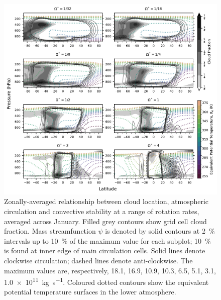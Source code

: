 \begin{figure}[tb]
    \centering
    \includegraphics[width=1.0\textwidth]{plots/3-cf_psi_ept_1J.pdf}
    \caption{Zonally-averaged relationship between cloud location, atmospheric circulation and convective stability at a range of rotation rates, averaged across January. Filled grey contours show grid cell cloud fraction. Mass streamfunction $\psi$ is denoted by solid contours at \SI{2}{\percent} intervals up to \SI{10}{\percent} of the maximum value for each subplot; \SI{10}{\percent} is found at inner edge of main circulation cells. Solid lines denote clockwise circulation; dashed lines denote anti-clockwise. The maximum values are, respectively, 18.1, 16.9, 10.9, 10.3, 6.5, 5.1, 3.1, \SI{1.0e11}{\kg\per\s}. Coloured dotted contours show the equivalent potential temperature surfaces in the lower atmosphere.}
    \label{fig:cf_psi_ept_DJF}
\end{figure}



